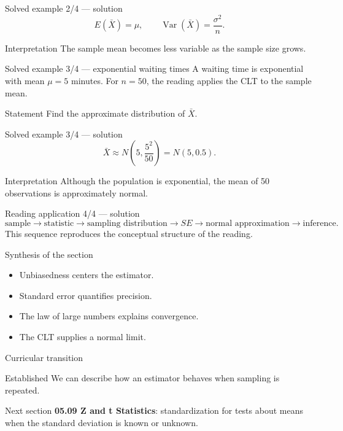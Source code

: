 \documentclass[10pt,aspectratio=169]{beamer}
\begin{document}
\begin{frame}{Solved example 2/4 --- solution}
  \footnotesize
  \[
    E(\bar X)=\mu,\qquad \operatorname{Var}(\bar X)=\frac{\sigma^2}{n}.
  \]
  \begin{exampleblock}{Interpretation}
    The sample mean becomes less variable as the sample size grows.
  \end{exampleblock}
\end{frame}

\begin{frame}{Solved example 3/4 --- exponential waiting times}
  \footnotesize
  A waiting time is exponential with mean $\mu=5$ minutes. For $n=50$, the
  reading applies the CLT to the sample mean.
  \begin{block}{Statement}
    Find the approximate distribution of $\bar X$.
  \end{block}
\end{frame}

\begin{frame}{Solved example 3/4 --- solution}
  \footnotesize
  \[
    \bar X\approx N\!\left(5,\frac{5^2}{50}\right)=N(5,0.5).
  \]
  \begin{alertblock}{Interpretation}
    Although the population is exponential, the mean of 50 observations is
    approximately normal.
  \end{alertblock}
\end{frame}

\begin{frame}{Reading application 4/4 --- solution}
  \footnotesize
  \[
    \text{sample}\to\text{statistic}\to\text{sampling distribution}
    \to SE\to\text{normal approximation}\to\text{inference}.
  \]
  This sequence reproduces the conceptual structure of the reading.
\end{frame}

\begin{frame}{Synthesis of the section}
  \footnotesize
  \begin{itemize}\itemsep=0.12cm
    \item Unbiasedness centers the estimator.
    \item Standard error quantifies precision.
    \item The law of large numbers explains convergence.
    \item The CLT supplies a normal limit.
  \end{itemize}
\end{frame}

\begin{frame}{Curricular transition}
  \footnotesize
  \begin{block}{Established}
    We can describe how an estimator behaves when sampling is repeated.
  \end{block}
  \begin{alertblock}{Next section}
    \textbf{05.09 Z and t Statistics}: standardization for tests about means
    when the standard deviation is known or unknown.
  \end{alertblock}
\end{frame}
\end{document}
